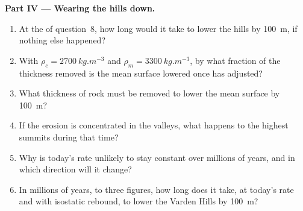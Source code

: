 \begin{problem}
\medskip
\noindent\textbf{Part IV --- Wearing the hills down.}
\begin{enumerate}[resume]
  \item At the  of question~8, how long would it take to lower
        the hills by \qty{100}{m}, if nothing else happened?
  \item With $\rho_c = \qty{2700}{kg.m^{-3}}$ and $\rho_m =
        \qty{3300}{kg.m^{-3}}$, by what fraction of the thickness removed is
        the mean surface lowered once  has adjusted?
  \item What thickness of rock must be removed to lower the mean surface by
        \qty{100}{m}?
  \item If the erosion is concentrated in the valleys, what happens to the
        highest summits during that time?
  \item Why is today's rate unlikely to stay constant over millions of
        years, and in which direction will it change?
  \item In millions of years, to three figures, how long does it take, at
        today's rate and with isostatic rebound, to lower the Varden Hills by
        \qty{100}{m}?
\end{enumerate}
\end{problem}
